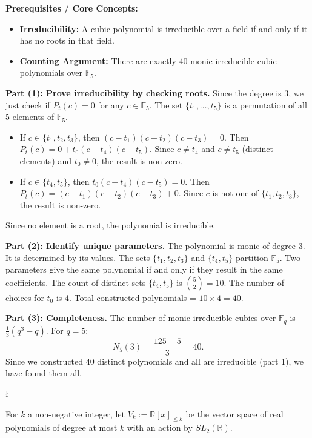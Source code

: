 \begin{solution}
\textbf{Prerequisites / Core Concepts:}
\begin{itemize}
    \item \textbf{Irreducibility:} A cubic polynomial is irreducible over a field if and only if it has no roots in that field.
    \item \textbf{Counting Argument:} There are exactly 40 monic irreducible cubic polynomials over $\mathbb{F}_5$.
\end{itemize}

\textbf{Part (1): Prove irreducibility by checking roots.}
Since the degree is 3, we just check if $P_t(c) = 0$ for any $c \in \mathbb{F}_5$.
The set $\{t_1, \dots, t_5\}$ is a permutation of all 5 elements of $\mathbb{F}_5$.
\begin{itemize}
    \item If $c \in \{t_1, t_2, t_3\}$, then $(c-t_1)(c-t_2)(c-t_3) = 0$. 
      Then $P_t(c) = 0 + t_0(c-t_4)(c-t_5)$. Since $c \neq t_4$ and $c \neq t_5$ (distinct elements) and $t_0 \neq 0$, the result is non-zero.
    \item If $c \in \{t_4, t_5\}$, then $t_0(c-t_4)(c-t_5) = 0$.
      Then $P_t(c) = (c-t_1)(c-t_2)(c-t_3) + 0$. Since $c$ is not one of $\{t_1, t_2, t_3\}$, the result is non-zero.
\end{itemize}
Since no element is a root, the polynomial is irreducible.

\textbf{Part (2): Identify unique parameters.}
The polynomial is monic of degree 3. It is determined by its values.
The sets $\{t_1, t_2, t_3\}$ and $\{t_4, t_5\}$ partition $\mathbb{F}_5$.
Two parameters give the same polynomial if and only if they result in the same coefficients.
The count of distinct sets $\{t_4, t_5\}$ is $\binom{5}{2} = 10$.
The number of choices for $t_0$ is 4.
Total constructed polynomials = $10 \times 4 = 40$.

\textbf{Part (3): Completeness.}
The number of monic irreducible cubics over $\mathbb{F}_q$ is $\frac{1}{3}(q^3 - q)$. For $q=5$:
\[ N_5(3) = \frac{125 - 5}{3} = 40. \]
Since we constructed 40 distinct polynomials and all are irreducible (part 1), we have found them all.
\end{solution}

\begin{exercise}
\l\label{2013:4}

\label{algebra:2013:4}For $k$ a non-negative integer, let $V_k := \mathbb{R}[x]_{\leq k}$ be the vector space of real polynomials of degree at most $k$ with an action by $SL_2(\mathbb{R})$.
\end{exercise}

